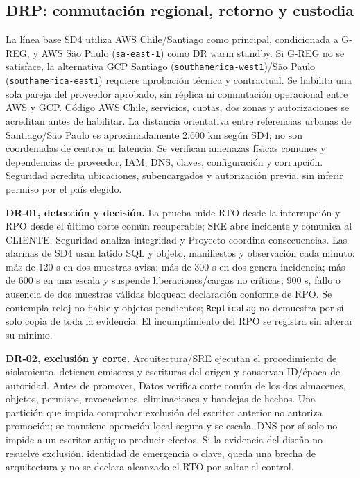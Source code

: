 \subsection{DRP: conmutación regional, retorno y custodia}\label{sec:sd8-drp}
La línea base SD4 utiliza AWS Chile/Santiago como principal, condicionada a G-REG, y AWS São Paulo (\texttt{sa-east-1}) como DR warm standby. Si G-REG no se satisface, la alternativa GCP Santiago (\texttt{southamerica-west1})/São Paulo (\texttt{southamerica-east1}) requiere aprobación técnica y contractual. Se habilita una sola pareja del proveedor aprobado, sin réplica ni conmutación operacional entre AWS y GCP. Código AWS Chile, servicios, cuotas, dos zonas y autorizaciones se acreditan antes de habilitar. La distancia orientativa entre referencias urbanas de Santiago/São Paulo es aproximadamente 2.600 km según SD4; no son coordenadas de centros ni latencia. Se verifican amenazas físicas comunes y dependencias de proveedor, IAM, DNS, claves, configuración y corrupción. Seguridad acredita ubicaciones, subencargados y autorización previa, sin inferir permiso por el país elegido.

\textbf{DR-01, detección y decisión.} La prueba mide RTO desde la interrupción y RPO desde el último corte común recuperable; SRE abre incidente y comunica al CLIENTE, Seguridad analiza integridad y Proyecto coordina consecuencias. Las alarmas de SD4 usan latido SQL y objeto, manifiestos y observación cada minuto: más de 120 s en dos muestras avisa; más de 300 s en dos genera incidencia; más de 600 s en una escala y suspende liberaciones/cargas no críticas; 900 s, fallo o ausencia de dos muestras válidas bloquean declaración conforme de RPO. Se contempla reloj no fiable y objetos pendientes; \texttt{ReplicaLag} no demuestra por sí solo copia de toda la evidencia. El incumplimiento del RPO se registra sin alterar su mínimo.

\textbf{DR-02, exclusión y corte.} Arquitectura/SRE ejecutan el procedimiento de aislamiento, detienen emisores y escrituras del origen y conservan ID/época de autoridad. Antes de promover, Datos verifica corte común de los dos almacenes, objetos, permisos, revocaciones, eliminaciones y bandejas de hechos. Una partición que impida comprobar exclusión del escritor anterior no autoriza promoción; se mantiene operación local segura y se escala. DNS por sí solo no impide a un escritor antiguo producir efectos. Si la evidencia del diseño no resuelve exclusión, identidad de emergencia o clave, queda una brecha de arquitectura y no se declara alcanzado el RTO por saltar el control.

